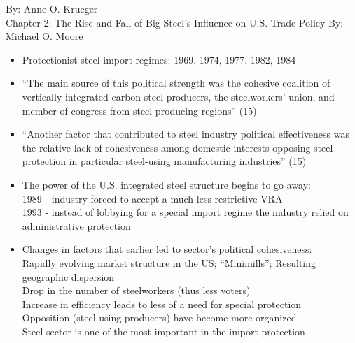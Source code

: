 \documentclass[10pt]{article}
\begin{document}
\normalsize By: Anne O. Krueger\\
Chapter 2: The Rise and Fall of Big Steel’s Influence on U.S. Trade Policy
By: Michael O. Moore 
\begin{itemize}
  \item Protectionist steel import regimes: 1969, 1974, 1977, 1982, 1984\\
  \item “The main source of this political strength was the cohesive coalition of vertically-integrated carbon-steel producers, the steelworkers’ union, and member of congress from steel-producing regions” (15)\\
  \item “Another factor that contributed to steel industry political effectiveness was the relative lack of cohesiveness among domestic interests opposing steel protection in particular steel-using manufacturing industries” (15)\\
  \item The power of the U.S. integrated steel structure begins to go away:\\ 
        1989 - industry forced to accept a much less restrictive VRA\\
        1993 - instead of lobbying for a special import regime the industry relied on administrative protection\\
  \item Changes in factors that earlier led to sector’s political cohesiveness:\\
        Rapidly evolving market structure in the US; “Minimills”; Resulting geographic dispersion\\
        Drop in the number of steelworkers (thus less voters)\\
        Increase in efficiency leads to less of a need for special protection\\
        Opposition (steel using producers) have become more organized\\
Steel sector is one of the most important in the import protection\\


\end{itemize}
\end{document}
